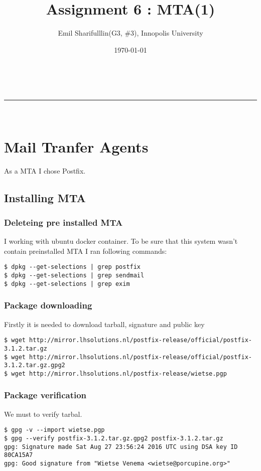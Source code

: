 \documentclass[a4paper,11pt]{article}
\makeatletter
\newcommand*{\TitleFont}{%
      \usefont{\encodingdefault}{\rmdefault}{b}{n}%
      \fontsize{16}{20}%
      \selectfont}
\newcommand{\linia}{\rule{\linewidth}{0.5pt}}
\theoremstyle{mytheor}
\renewcommand{\maketitle}{
\begin{center}
\vspace{2ex}
{\huge \textsc{\@title}}
\vspace{1ex}
\\
\linia\\
\@author \hfill \@date
\vspace{4ex}
\end{center}
}
\makeatother
\begin{document}
\title{\TitleFont Assignment 6 : MTA(1) }

\author{Emil Sharifulllin(G3, \#3), Innopolis University}

\date{\today}

\maketitle

\section{Mail Tranfer Agents}
As a MTA I chose Postfix.

\subsection{Installing MTA}

\subsubsection{Deleteing pre installed MTA}
I working with ubuntu docker container. To be sure that this system wasn't contain preinstalled MTA I ran following commands:

\begin{lstlisting}
$ dpkg --get-selections | grep postfix
$ dpkg --get-selections | grep sendmail
$ dpkg --get-selections | grep exim

\end{lstlisting}

\subsubsection{Package downloading}
Firstly it is needed to download tarball, signature and public key

\begin{lstlisting}
$ wget http://mirror.lhsolutions.nl/postfix-release/official/postfix-3.1.2.tar.gz
$ wget http://mirror.lhsolutions.nl/postfix-release/official/postfix-3.1.2.tar.gz.gpg2
$ wget http://mirror.lhsolutions.nl/postfix-release/wietse.pgp
\end{lstlisting}

\subsubsection{Package verification}

We must to verify tarbal.
\begin{lstlisting}
$ gpg -v --import wietse.pgp
$ gpg --verify postfix-3.1.2.tar.gz.gpg2 postfix-3.1.2.tar.gz
gpg: Signature made Sat Aug 27 23:56:24 2016 UTC using DSA key ID 80CA15A7
gpg: Good signature from "Wietse Venema <wietse@porcupine.org>"
\end{lstlisting}
\end{document}
